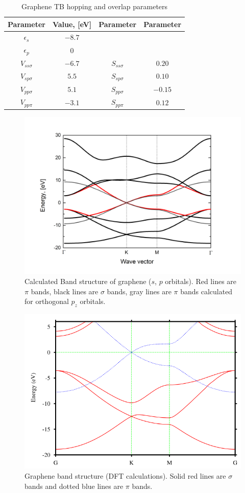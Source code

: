 \begin{table}[h]
\begin{center}
\begin{tabular}{|c |c |c| c|}
\hline
Parameter&Value, [eV]&Parameter&Parameter\\ \hline
$\epsilon_s$ &$- 8.7$ & &\\ \hline
$\epsilon_p$&$0$ & &\\ \hline
$V_{ss\sigma}$&$- 6.7$ & $S_{ss\sigma}$&$0.20$\\ \hline
$V_{sp\sigma} $&$5.5$ & $S_{sp\sigma}$&$0.10$\\  \hline
$V_{pp\sigma}$&$5.1$ & $S_{pp\sigma}$&$- 0.15$\\ \hline
$V_{pp\pi}$&$- 3.1$ & $S_{pp\pi}$&$0.12$ \\ \hline  
\end{tabular}
\end{center}
\caption{Graphene TB hopping and overlap parameters \cite{basics}}
\label{tab:graphene_overlap_parameters}
\end{table}

\begin{figure}[hb] 
\begin{center}
  \includegraphics[width=0.6\linewidth]{img/graphene_sp}
  \caption{Calculated Band structure of graphene ($s$, $p$ orbitals). Red lines are $\pi$ bands, black lines are $\sigma$ bands, gray lines are $\pi$ bands calculated for orthogonal $p_z$ orbitals. \label{fig:graphene_sp}}
\end{center}
\end{figure}

\begin{figure}[h] 
\begin{center}
  \includegraphics[width=0.6\linewidth]{img/graphene_dft}
  \caption{Graphene band structure (DFT calculations). Solid red lines are $\sigma$ bands and dotted blue lines are $\pi$ bands. \cite{boukhvalov} \label{fig:graphene_dft}}
\end{center}
\end{figure}

